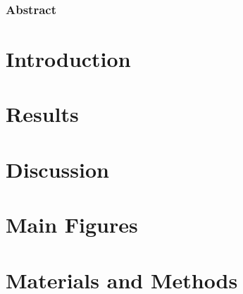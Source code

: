 \documentclass[12pt]{article}
\begin{document}
\onehalfspacing





\begin{center}
\subsubsection*{Abstract}
\end{center}
\label{sec:abstract}

\clearpage

\linenumbers

\section{Introduction}
\label{sec:introduction}


\section{Results}
\label{sec:results}


\section{Discussion}
\label{sec:discussion}

\clearpage

\label{sec:acknowledgments}

\clearpage


\nolinenumbers

\section{Main Figures}
\label{sec:figures}

\clearpage

\restoregeometry

\label{sec:supplementary}

\clearpage

\linenumbers
\onehalfspacing

\section{Materials and Methods}
\label{sec:materials_and_methods}











\end{document}
